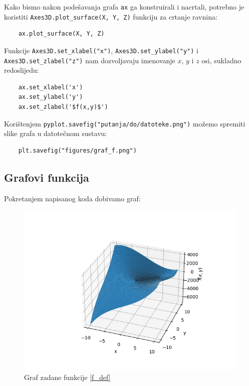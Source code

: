 Kako bismo nakon podešavanja grafa \verb|ax| ga konstruirali i nacrtali, potrebno je koristiti \verb|Axes3D.plot_surface(X, Y, Z)| funkciju za crtanje ravnina:
\begin{verbatim}
    ax.plot_surface(X, Y, Z)
\end{verbatim}

Funkcije \verb|Axes3D.set_xlabel("x")|, \verb|Axes3D.set_ylabel("y")| i\\\verb|Axes3D.set_zlabel("z")| nam dozvoljavaju imenovanje $x$, $y$ i $z$ osi, sukladno redoslijedu:
\begin{verbatim}
    ax.set_xlabel('x')
    ax.set_ylabel('y')
    ax.set_zlabel('$f(x,y)$')
\end{verbatim}

Korištenjem \verb|pyplot.savefig("putanja/do/datoteke.png")| možemo spremiti slike grafa u datotečnom sustavu:
\begin{verbatim}
    plt.savefig("figures/graf_f.png")
\end{verbatim}

\newpage

\subsection{Grafovi funkcija}

Pokretanjem napisanog koda dobivamo graf:
\begin{figure}[H]
    \centering
    \includegraphics[width=400pt]{figures/graf_f.png}
    \caption{Graf zadane funkcije \eqref{f_def}}
\end{figure}

